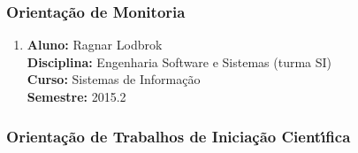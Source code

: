 \documentclass[a4paper,oneside,10pt]{article}
\begin{document}

\subsubsection{Orienta\c{c}\~{a}o de Monitoria}
\vspace{0.3cm}

\begin{enumerate}
\renewcommand{\labelenumi}{{\large\bfseries\arabic{enumi}.}}

\item   \textbf{Aluno:} Ragnar Lodbrok \mbox{} \\
        \textbf{Disciplina:}  Engenharia Software e Sistemas (turma SI)\\
        \textbf{Curso:} Sistemas de Informação\\
        \textbf{Semestre:} 2015.2

%
%
%
%
%
%

\end{enumerate}


\subsubsection{Orienta\c{c}\~{a}o de Trabalhos de Inicia\c{c}\~{a}o Cient\'{\i}fica}
\vspace{0.3cm}
\end{document}
